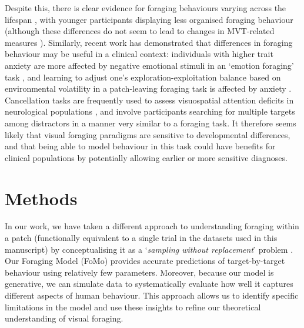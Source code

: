 \documentclass[man, floatsintext]{apa7}
\begin{document}
Despite this, there is clear evidence for foraging behaviours varying across the lifespan \citep{olafsdottir2020, olafsdottir2021, bella2024}, with younger participants displaying less organised foraging behaviour (although these differences do not seem to lead to changes in MVT-related measures \cite{de2022quitting, de2022foragekid}). Similarly, recent work has demonstrated that differences in foraging behaviour may be useful in a clinical context: individuals with higher trait anxiety are more affected by negative emotional stimuli in an `emotion foraging' task \cite{tagu2025foraging}, and learning to adjust one's exploration-exploitation balance based on environmental volatility in a patch-leaving foraging task is affected by anxiety \cite{lloyd2025stochastic}. Cancellation tasks are frequently used to assess visuospatial attention deficits in neurological populations \citep{checketts2021current, moore2022rapid}, and involve participants searching for multiple targets among distractors in a manner very similar to a foraging task. It therefore seems likely that visual foraging paradigms are sensitive to developmental differences, and that being able to model behaviour in this task could have benefits for clinical populations by potentially allowing earlier or more sensitive diagnoses.

\section{Methods}

In our work, we have taken a different approach to understanding foraging within a patch (functionally equivalent to a single trial in the datasets used in this manuscript) by conceptualising it as a `\textit{sampling without replacement}' problem \citep{clarke2022foraging}. Our Foraging Model (FoMo) provides accurate predictions of target-by-target behaviour using relatively few parameters. Moreover, because our model is generative, we can simulate data to systematically evaluate how well it captures different aspects of human behaviour. This approach allows us to identify specific limitations in the model and use these insights to refine our theoretical understanding of visual foraging.
\end{document}
